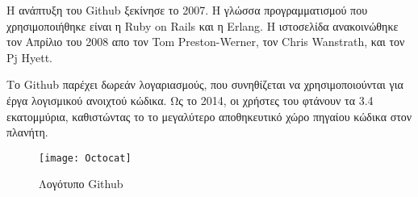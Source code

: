 Η ανάπτυξη του Github ξεκίνησε το 2007. Η γλώσσα προγραμματισμού που χρησιμοποιήθηκε είναι η Ruby on Rails και η Erlang. Η ιστοσελίδα ανακοινώθηκε τον Απρίλιο του 2008 απο τον Tom Preston-Werner, τον Chris Wanstrath, και τον Pj Hyett.

Το Github παρέχει δωρεάν λογαριασμούς, που συνηθίζεται να χρησιμοποιούνται για έργα λογισμικού ανοιχτού κώδικα. Ως το 2014, οι χρήστες του φτάνουν τα 3.4 εκατομμύρια, καθιστώντας το το μεγαλύτερο αποθηκευτικό χώρο πηγαίου κώδικα στον πλανήτη.\\
\begin{figure}[h]
\centering
\texttt{[image: Octocat]}
\caption{Λογότυπο Github}
\end{figure}

